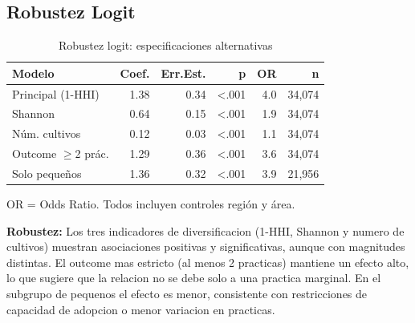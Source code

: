 \documentclass[10pt,a4paper]{article}
\begin{document}
\subsection{Robustez Logit}

\begin{table}[H]
\centering
\caption{Robustez logit: especificaciones alternativas}
\label{tab:logit_robustness}
\begin{threeparttable}
\small
\begin{tabular}{lrrrrr}
\toprule
\textbf{Modelo} & \textbf{Coef.} & \textbf{Err.Est.} & \textbf{p} & \textbf{OR} & \textbf{n} \\
\midrule
Principal (1-HHI) & 1.38 & 0.34 & <.001 & 4.0 & 34,074 \\
Shannon & 0.64 & 0.15 & <.001 & 1.9 & 34,074 \\
Núm. cultivos & 0.12 & 0.03 & <.001 & 1.1 & 34,074 \\
Outcome $\geq$2 prác. & 1.29 & 0.36 & <.001 & 3.6 & 34,074 \\
Solo pequeños & 1.36 & 0.32 & <.001 & 3.9 & 21,956 \\
\bottomrule
\end{tabular}
\begin{tablenotes}
\footnotesize
\item OR = Odds Ratio. Todos incluyen controles región y área.
\end{tablenotes}
\end{threeparttable}
\end{table}

\textbf{Robustez:} Los tres indicadores de diversificacion (1-HHI, Shannon y numero de cultivos) muestran asociaciones positivas y significativas, aunque con magnitudes distintas. El outcome mas estricto (al menos 2 practicas) mantiene un efecto alto, lo que sugiere que la relacion no se debe solo a una practica marginal. En el subgrupo de pequenos el efecto es menor, consistente con restricciones de capacidad de adopcion o menor variacion en practicas.
\end{document}

